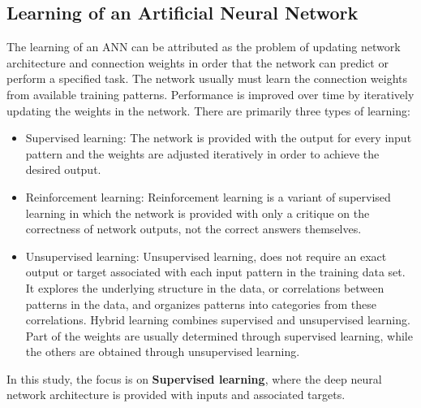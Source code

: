 \subsection{Learning of an Artificial Neural Network}
The learning of an ANN can be attributed as the problem of updating network architecture and connection weights	in order that the network can predict or perform a specified task. The network usually must learn the connection weights from available training patterns. Performance is improved over time by iteratively updating the weights in the network. There are primarily three types of learning:
\begin{itemize}
\item Supervised learning: The network is provided with the output for every input pattern and the weights are adjusted iteratively in order to achieve the desired output.
\item Reinforcement learning: Reinforcement learning is a variant of supervised learning in which the network is provided with only a critique
on the correctness of network outputs, not the correct answers themselves.
\item Unsupervised learning: Unsupervised learning, does not require an exact output or target associated with each input pattern in the training data set. It explores the underlying structure in the data, or correlations between patterns in the data, and organizes patterns into categories from these correlations. Hybrid learning combines supervised and unsupervised learning. Part of the weights are usually determined through supervised learning, while the others are obtained through unsupervised learning.
\end{itemize}
In this study, the focus is on \textbf{Supervised learning}, where the deep neural network architecture is provided with inputs and associated targets.
